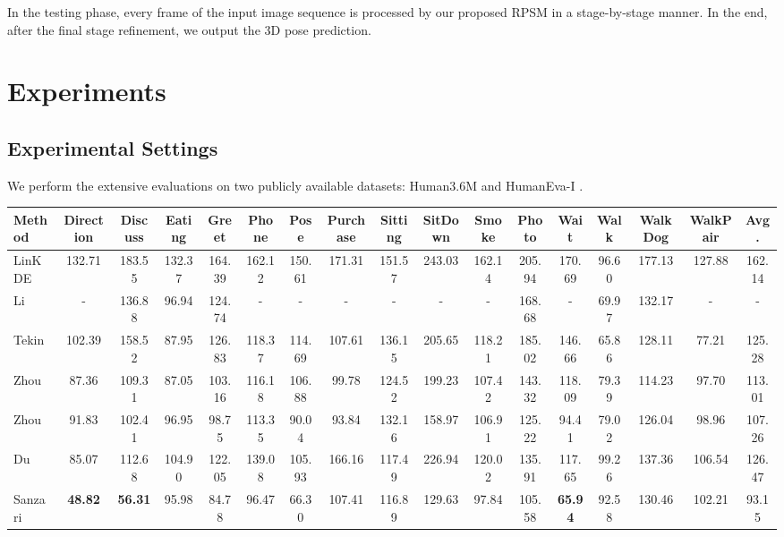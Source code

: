 \documentclass[10pt,twocolumn,letterpaper]{article}
\begin{document}
In the testing phase, every frame of the input image sequence is processed by our proposed RPSM in a stage-by-stage manner. In the end, after the final stage refinement, we output the 3D pose prediction. 




\section{Experiments}
\subsection{Experimental Settings}
We perform the extensive evaluations on two publicly available datasets: Human3.6M \cite{huamn3.6m} and HumanEva-I \cite{sigal2010humaneva}. 

\begin{table*}[tp]
\setlength{\tabcolsep}{1.5pt}
	\centering
	\begin{adjustbox}{max width=1.0\textwidth}
	\begin{tabular}{@{}l|ccccccccccccccc|c@{}}
	\toprule
	 Method & Direction & Discuss & Eating & Greet & Phone & Pose & Purchase & Sitting & SitDown & Smoke & Photo & Wait & Walk & WalkDog & WalkPair & Avg. \\ \midrule
	LinKDE \cite{huamn3.6m}& 132.71 & 183.55 & 132.37 & 164.39 & 162.12 & 150.61 & 171.31 & 151.57 & 243.03 & 162.14 & 205.94 & 170.69 & 96.60 & 177.13 & 127.88 & 162.14 \\
	Li \etal \cite{li2015maximum} & - & 136.88 & 96.94 & 124.74 & - & - & - & - & - & - & 168.68 &  - & 69.97 & 132.17 & - & - \\
	Tekin \etal \cite{Tekin_2016_CVPR} & 102.39 & 158.52 & 87.95 & 126.83 & 118.37 & 114.69 & 107.61 & 136.15 & 205.65 & 118.21 & 185.02 & 146.66 & 65.86 & 128.11 & 77.21 & 125.28 \\
	Zhou \etal \cite{zhou2015sparseness} & 87.36 & 109.31 & 87.05 & 103.16 & 116.18 & 106.88 & 99.78 & 124.52 & 199.23 & 107.42 & 143.32 & 118.09 & 79.39 & 114.23 & 97.70 & 113.01 \\
	Zhou \etal \cite{zhou2016deep} & 91.83 & 102.41 & 96.95 & 98.75 & 113.35 & 90.04 & 93.84 & 132.16 & 158.97 & 106.91 & 125.22 & 94.41 & 79.02 & 126.04 & 98.96 & 107.26 \\
	Du \etal \cite{DBLP:conf/eccv/DuWLHGWKG16} & 85.07 & 112.68 & 104.90 & 122.05 & 139.08 & 105.93 & 166.16 & 117.49 & 226.94 & 120.02 & 135.91 & 117.65 & 99.26 & 137.36 & 106.54 & 126.47 \\
	Sanzari \etal \cite{DBLP:conf/eccv/SanzariNP16} & \textbf{48.82} & \textbf{56.31} & 95.98 & 84.78 & 96.47 & 66.30 & 107.41 & 116.89 & 129.63 & 97.84 & 105.58 & \textbf{65.94} & 92.58 & 130.46 & 102.21 & 93.15 \\

\end{tabular}
\end{adjustbox}
\end{table*}
\end{document}
